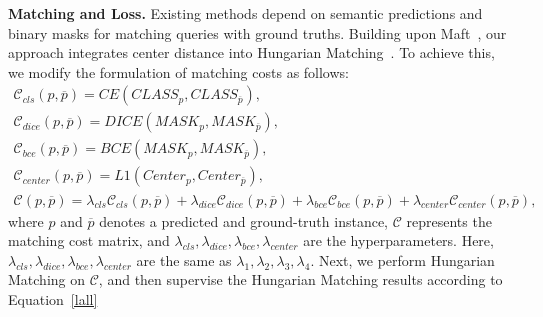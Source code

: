\textbf{Matching and Loss.} 
Existing methods depend on semantic predictions and binary masks for matching queries with ground truths. 
%
Building upon Maft~\cite{lai2023mask}, our approach integrates center distance into Hungarian Matching~\cite{kuhn1955hungarian}. 
%
To achieve this, we modify the formulation of matching costs as follows:
\begin{gather}
  \label{cost}
  \mathcal{C}_{cls} (p, \overline{p} ) = CE(CLASS_p, CLASS_{\overline{p}}), \\
  \mathcal{C}_{dice} (p, \overline{p} ) = DICE(MASK_p, MASK_{\overline{p}}), \\
  \mathcal{C}_{bce} (p, \overline{p} ) = BCE(MASK_p, MASK_{\overline{p}}), \\
  \mathcal{C}_{center} (p, \overline{p} ) = L1(Center_p, Center_{\overline{p}}), \\
  \mathcal{C}(p, \overline{p} ) = \lambda_{cls}\mathcal{C}_{cls} (p, \overline{p} ) + \lambda_{dice}\mathcal{C}_{dice} (p, \overline{p} ) + \lambda_{bce}\mathcal{C}_{bce} (p, \overline{p} ) +\lambda_{center}\mathcal{C}_{center} (p, \overline{p} ), 
\end{gather}
where $p$ and $\overline{p}$ denotes a predicted and ground-truth instance, $\mathcal{C}$ represents the matching cost matrix, and $\lambda_{cls}, \lambda_{dice}, \lambda_{bce}, \lambda_{center}$ are the hyperparameters. Here, $\lambda_{cls}, \lambda_{dice}, \lambda_{bce}, \lambda_{center}$ are the same as $\lambda_{1}, \lambda_{2}, \lambda_{3}, \lambda_{4}$.
Next, we perform Hungarian Matching on $\mathcal{C}$, and then supervise the Hungarian Matching results according to Equation~\ref{lall}



